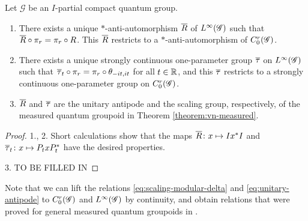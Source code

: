 \begin{Prop}
  Let $\mathscr{G}$ be an $I$-partial compact quantum group.  
  \begin{enumerate}
  \item  There exists a unique $*$-anti-automorphism $\overline{R}$ of
    $L^{\infty}(\mathscr{G})$ such that $\overline{R} \circ \pi_{r} = \pi_{r} \circ R$.
    This $\overline{R}$ restricts to a $*$-anti-automorphism of
    $C^{r}_{0}(\mathscr{G})$.
  \item  There exists a unique strongly continuous
    one-parameter group $\overline{\tau}$ on $L^{\infty}(\mathscr{G})$ such that $\overline{\tau}_{t}
    \circ \pi_{r} = \pi_{r} \circ \theta_{-it,it}$ for all $t\in \mathbb{R}$,
    and this $\overline{\tau}$ restricts to a strongly continuous one-parameter
    group on $C^{r}_{0}(\mathscr{G})$.
  \item $\overline{R}$ and $\overline{\tau}$ are the unitary antipode and the
    scaling group, respectively, of the measured
    quantum groupoid in Theorem \ref{theorem:vn-measured}.
  \end{enumerate}
\end{Prop}
\begin{proof}
  1., 2.  Short calculations show that the maps $\overline{R} \colon x \mapsto
  Ix^{*}I$ and $\overline{\tau}_{t} \colon x \mapsto P_{t}xP_{t}^{*}$ have the
  desired properties.

  3. TO BE FILLED IN
\end{proof}
\begin{Rem}
  Note that we can lift the relations \eqref{eq:scaling-modular-delta}
  and \eqref{eq:unitary-antipode} to $C^{r}_{0}(\mathscr{G})$ and $L^{\infty}(\mathscr{G})$ by
  continuity, and obtain relations that were proved for general
  measured quantum groupoids in \cite{}.
\end{Rem}

